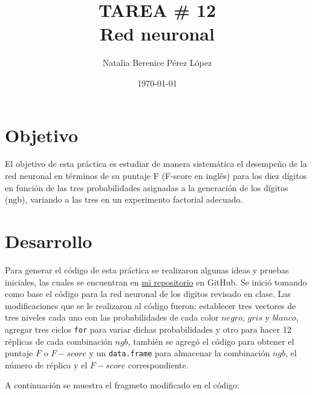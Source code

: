 \documentclass{article}
\title{TAREA \# 12 \\ Red neuronal} %
\author{Natalia Berenice P\'{e}rez L\'{o}pez} %
\date{\today}
\begin{document}

\maketitle %

\section{Objetivo}
El objetivo de esta práctica es estudiar de manera sistemática el desempeño de la red neuronal en términos de su puntaje F (F-score en inglés) para los diez dígitos en función de las tres probabilidades asignadas a la generación de los dígitos (ngb), variando a las tres en un experimento factorial adecuado.

\section{Desarrollo} %
Para generar el código de esta práctica se realizaron algunas ideas y pruebas iniciales, las cuales se encuentran en \href{https://github.com/nataliaperez0/Simulation/tree/main/Tarea12}{mi repositorio}  en GitHub. Se inició tomando como base el código para la red neuronal de los digitos \citep{1} revisado en clase. Las modificaciones que se le realizaron al código fueron: establecer tres vectores de tres niveles cada uno con las probabilidades de cada color $negro$, $gris$ y $blanco$, agregar tres ciclos \texttt{for} para variar dichas probabilidades y otro para hacer $12$ réplicas de cada combinación $ngb$, también se agregó el código para obtener el puntaje $F$ o $F-score$ y un \texttt{data.frame} para almacenar la combinación $ngb$, el número de réplica y el $F-score$ correspondiente.
\smallskip

A continuación se muestra el fragmeto modificado en el código: 


\end{document}
